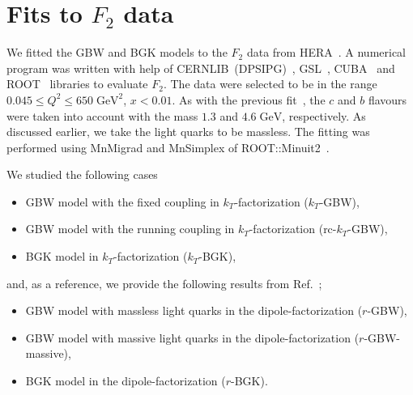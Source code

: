 \documentclass[11pt]{article}
\begin{document}
\section{Fits to $F_2$ data}
\label{sec:F2fits}

We fitted the GBW and BGK models to the $F_2$ data from
HERA~\cite{Abt:2017nkc}. A numerical program was written with help of
CERNLIB~(DPSIPG)~\cite{Kolbig:1972zz}, GSL~\cite{GSL}, CUBA~\cite{Hahn:2004fe}
and ROOT~\cite{Brun:1997pa} libraries to evaluate $F_2$. The data were selected
to be in the range $0.045\leq Q^2\leq 650\;\mathrm{GeV^2}$, $x<0.01$.  As with
the previous fit~\cite{Goda:2022wsc}, the $c$ and $b$ flavours were taken into
account with the mass $1.3$ and $4.6\;\mathrm{GeV}$, respectively. As discussed
earlier, we take the light quarks to be massless.  The fitting was performed
using MnMigrad and MnSimplex of ROOT::Minuit2~\cite{James:2004xla}.

We studied the following cases
%
\begin{itemize}
\item GBW model with the fixed coupling in $k_T$-factorization  ($k_T$-GBW),
\item GBW model with the running coupling in $k_T$-factorization (rc-$k_T$-GBW),
\item BGK model in $k_T$-factorization ($k_T$-BGK),
\end{itemize} 
%
and, as a reference, we provide the following results from
Ref.~\cite{Goda:2022wsc};
%
\begin{itemize}
\item GBW model with massless light quarks in the dipole-factorization ($r$-GBW),
\item GBW model with massive light quarks in the dipole-factorization ($r$-GBW-massive),
\item  BGK model in  the dipole-factorization ($r$-BGK).
\end{itemize} 
\end{document}
